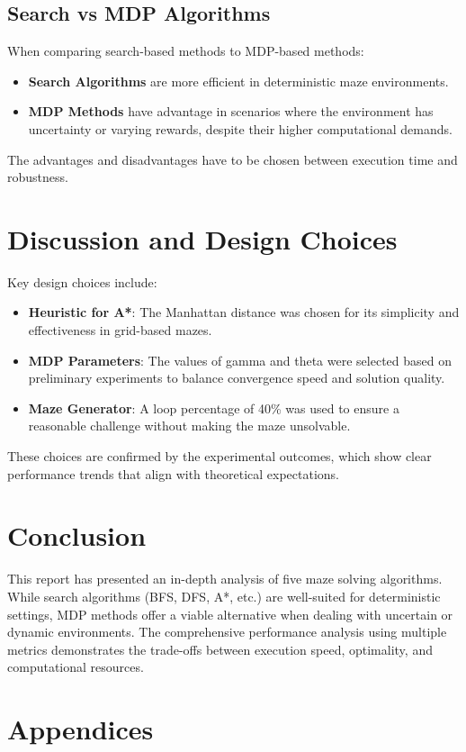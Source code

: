 \documentclass{article}
\begin{document}
\subsection{Search vs MDP Algorithms}
When comparing search-based methods to MDP-based methods:
\begin{itemize}
    \item \textbf{Search Algorithms} are more efficient in deterministic maze environments.
    \item \textbf{MDP Methods} have advantage in scenarios where the environment has uncertainty or varying rewards, despite their higher computational demands.
\end{itemize}
The advantages and disadvantages have to be chosen between execution time and robustness.

\section{Discussion and Design Choices}
Key design choices include:
\begin{itemize}
    \item \textbf{Heuristic for A*}: The Manhattan distance was chosen for its simplicity and effectiveness in grid-based mazes.
    \item \textbf{MDP Parameters}: The values of gamma and theta were selected based on preliminary experiments to balance convergence speed and solution quality.
    \item \textbf{Maze Generator}: A loop percentage of 40\% was used to ensure a reasonable challenge without making the maze unsolvable.
\end{itemize}
These choices are confirmed by the experimental outcomes, which show clear performance trends that align with theoretical expectations.

\section{Conclusion}
This report has presented an in-depth analysis of five maze solving algorithms. While search algorithms (BFS, DFS, A*, etc.) are well-suited for deterministic settings, MDP methods offer a viable alternative when dealing with uncertain or dynamic environments. The comprehensive performance analysis using multiple metrics demonstrates the trade-offs between execution speed, optimality, and computational resources.

\section*{Appendices}
\end{document}
